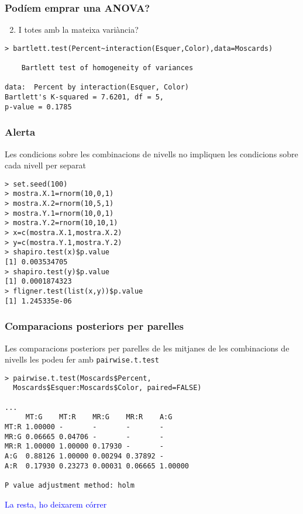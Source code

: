 \documentclass[12pt,t]{beamer}
\newcommand{\blue}[1]{\textcolor{blue}{#1}}
\theoremstyle{plain}
\theoremstyle{definition}
\begin{document}
\begin{frame}[fragile]
\frametitle{Podíem emprar una ANOVA?}\vspace*{-2ex}

\begin{enumerate}\setcounter{enumi}{1}
\item I totes amb la mateixa variància?
\end{enumerate}

\begin{lstlisting}
> bartlett.test(Percent~interaction(Esquer,Color),data=Moscards)

	Bartlett test of homogeneity of variances

data:  Percent by interaction(Esquer, Color)
Bartlett's K-squared = 7.6201, df = 5, 
p-value = 0.1785
\end{lstlisting}


\end{frame}



\begin{frame}[fragile]
\frametitle{Alerta} 

Les condicions sobre les combinacions de nivells no impliquen les condicions sobre cada nivell per separat\medskip


\begin{lstlisting}
> set.seed(100)
> mostra.X.1=rnorm(10,0,1)
> mostra.X.2=rnorm(10,5,1)
> mostra.Y.1=rnorm(10,0,1)
> mostra.Y.2=rnorm(10,10,1)
> x=c(mostra.X.1,mostra.X.2)
> y=c(mostra.Y.1,mostra.Y.2)
> shapiro.test(x)$p.value
[1] 0.003534705
> shapiro.test(y)$p.value
[1] 0.0001874323
> fligner.test(list(x,y))$p.value
[1] 1.245335e-06
\end{lstlisting}

\end{frame}





\begin{frame}[fragile]
\frametitle{Comparacions posteriors per parelles} 

Les comparacions posteriors per parelles de les mitjanes de les combinacions de nivells les podeu fer amb \texttt{pairwise.t.test}

\begin{lstlisting}
> pairwise.t.test(Moscards$Percent,   
  Moscards$Esquer:Moscards$Color, paired=FALSE)

...
     MT:G    MT:R    MR:G    MR:R    A:G    
MT:R 1.00000 -       -       -       -      
MR:G 0.06665 0.04706 -       -       -      
MR:R 1.00000 1.00000 0.17930 -       -      
A:G  0.88126 1.00000 0.00294 0.37892 -      
A:R  0.17930 0.23273 0.00031 0.06665 1.00000

P value adjustment method: holm 
\end{lstlisting}
\pause
 
 \blue{La resta, ho deixarem córrer}

\end{frame}
\end{document}
